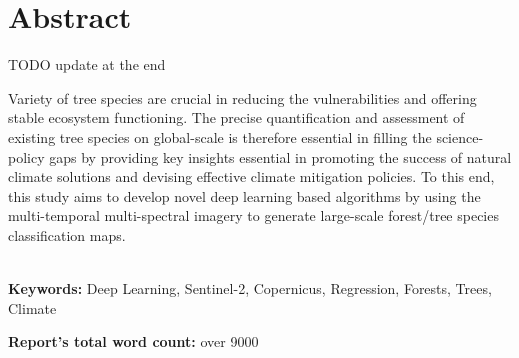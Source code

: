 \chapter*{\center \Large  Abstract}
TODO update at the end

Variety of tree species are crucial in reducing the vulnerabilities and offering stable ecosystem functioning. The precise quantification and assessment of existing tree species on global-scale is therefore essential in filling the science-policy gaps by providing key insights essential in promoting the success of natural climate solutions and devising effective climate mitigation policies. To this end, this study aims to develop novel deep learning based algorithms by using the multi-temporal multi-spectral imagery to generate large-scale forest/tree species classification maps.

~\\[1cm]
\noindent %
\textbf{Keywords:} Deep Learning, Sentinel-2, Copernicus, Regression, Forests, Trees, Climate

\vfill
\noindent
\textbf{Report's total word count:} over 9000